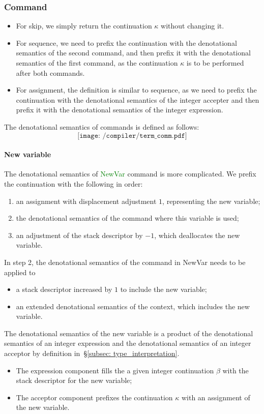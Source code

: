 \documentclass[12pt,a4paper]{report}
\theoremstyle{definition}
\newcommand{\secref}[1]{\S\ref{#1}}
\newcommand{\gn}[1]{\textcolor{green}{#1}}
\newcommand{\gnt}[1]{\gn{\textsf{#1}}}
\begin{document}
        \subsubsection{Command}
        \begin{itemize}
            \item For skip, we simply return the continuation $\kappa$ without changing it.
            \item For sequence, we need to prefix the continuation with the denotational semantics of the second command, and then prefix it with the denotational semantics of the first command, as the continuation $\kappa$ is to be performed after both commands.
            \item For assignment, the definition is similar to sequence, as we need to prefix the continuation with the denotational semantics of the integer accepter and then prefix it with the denotational semantics of the integer expression.
        \end{itemize}
        The denotational semantics of commands is defined as follows:
        \[\texttt{[image: /compiler/term\_comm.pdf]}\]

        \paragraph{New variable}
        The denotational semantics of \gnt{NewVar} command is more complicated. We prefix the continuation with the following in order:
        \begin{enumerate}
            \item an assignment with displacement adjustment $1$, representing the new variable;
            \item the denotational semantics of the command where this variable is used;
            \item an adjustment of the stack descriptor by $-1$, which deallocates the new variable.
        \end{enumerate}
        In step 2, the denotational semantics of the command in \textsf{NewVar} needs to be applied to
        \begin{itemize}
            \item a stack descriptor increased by $1$ to include the new variable;
            \item an extended denotational semantics of the context, which includes the new variable.
        \end{itemize}
        The denotational semantics of the new variable is a product of the denotational semantics of an integer expression and the denotational semantics of an integer acceptor by definition in~\secref{subsec: type_interpretation}.
        \begin{itemize}
            \item The expression component fills the a given integer continuation $\beta$ with the stack descriptor for the new variable;
            \item The acceptor component prefixes the continuation $\kappa$ with an assignment of the new variable.
        \end{itemize}
\end{document}
